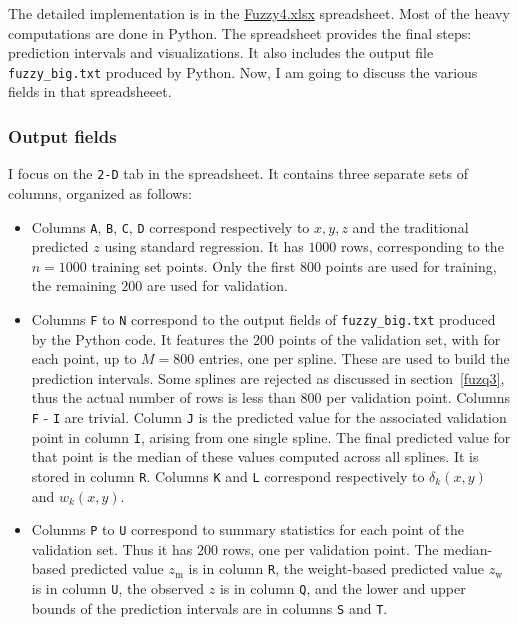 \documentclass[oneside,10pt]{book}
\begin{document}
The detailed implementation is in the \href{https://ln5.sync.com/dl/0caeb8e10/mztnibg9-xrkdks7g-r8bsgabw-3fsizwif}{Fuzzy4.xlsx} spreadsheet. Most of the heavy computations are done in Python. The spreadsheet provides the final steps: prediction intervals and visualizations. It also includes the output file \texttt{fuzzy\_big.txt} produced by Python. Now, I am going to discuss 
the various fields in that spreadsheeet.

\subsubsection{Output fields}

I focus on the \texttt{2-D} tab in the spreadsheet. It contains three separate sets of columns, organized as follows:

\begin{itemize}
\item Columns \texttt{A}, \texttt{B}, \texttt{C}, \texttt{D} correspond respectively to $x, y, z$ and the traditional predicted $z$ using standard regression. It has $1000$ rows, corresponding to the $n=1000$ training set points. Only the first $800$ points are used for training, the remaining $200$ are used for validation.
\item Columns \texttt{F} to \texttt{N} correspond to the output fields of  \texttt{fuzzy\_big.txt} produced by the Python code. It features the $200$ points of the validation set, with for each point, up to $M=800$ entries, one per spline. These are used to build the prediction intervals. Some splines are rejected as discussed in section~\ref{fuzq3}, thus the actual number of rows is less than $800$ per validation point. Columns \texttt{F} - \texttt{I} are trivial. Column \texttt{J} is the predicted value for the associated validation point in column \texttt{I}, arising from one single spline. The final predicted value for that point is the median of these values computed across all splines. It is stored in column \texttt{R}. Columns \texttt{K} and \texttt{L} correspond respectively 
to $\delta_k(x,y)$ and $w_k(x,y)$. 
\item Columns \texttt{P} to \texttt{U} correspond to summary statistics for each point of the validation set. Thus it has $200$ rows, one per validation point. The median-based predicted
 value $z_{\text{m}}$ is in column \texttt{R}, the weight-based predicted value $z_{\text{w}}$ is in column \texttt{U}, the observed $z$ is in column \texttt{Q}, and the lower and upper bounds of the prediction intervals are in columns \texttt{S} and \texttt{T}. 
\end{itemize} 
\end{document}
